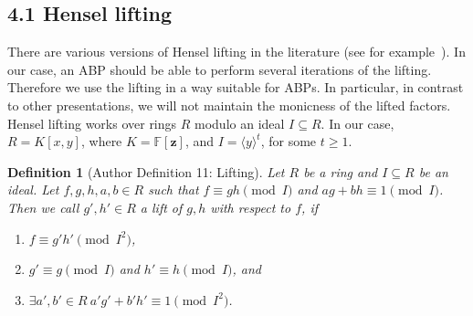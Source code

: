\documentclass[10pt,a4paper]{article}
\newtheorem{ntdefinition}[nttheorem]{Definition}
\begin{document}
\subsection*{4.1 Hensel lifting}
There are various versions of Hensel lifting in the literature (see for example~\cite{ref18}). In our case, an ABP should be able to perform several iterations of the lifting. Therefore we use the lifting in a way suitable for ABPs. In particular, in contrast to other presentations, we will not maintain the monicness of the lifted factors.
Hensel lifting works over rings $R$ modulo an ideal $I\subseteq R$. In our case,$R=K[x,y]$, where $K=\mathbb F[\mathbf z]$, and $I=\langle y\rangle^t$, for some $t\geq1$.
\begin{ntdefinition}[Author Definition 11: Lifting]
Let $R$ be a ring and $I\subseteq R$ be an ideal. Let $f,g,h,a,b\in R$ such that $f\equiv gh\pmod I$ and $ag+bh\equiv1\pmod I$. Then we call $g',h'\in R$ a lift of $g,h$ with respect to $f$, if
\begin{enumerate}
\item[(i)] $f\equiv g'h'\pmod{I^2}$,
\item[(ii)] $g'\equiv g\pmod I$ and $h'\equiv h\pmod I$, and
\item[(iii)] $\exists a',b'\in R\ a'g'+b'h'\equiv1\pmod{I^2}$.
\end{enumerate}
\end{ntdefinition}
\end{document}
